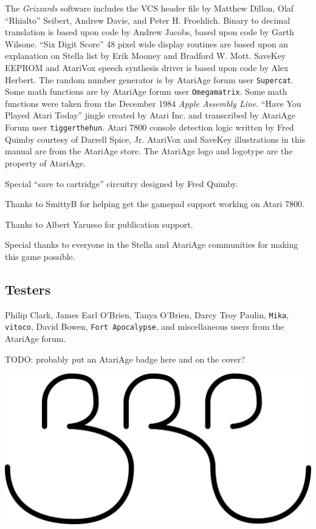 \documentclass[10pt,twocolumn,openany,article]{memoir}
\begin{document}
The \textit{Grizzards} software includes the  VCS header file by Matthew
Dillon, Olaf ``Rhialto'' Seibert, Andrew  Davie, and Peter H. Froehlich.
Binary to decimal translation is based upon code by Andrew Jacobs, based
upon code  by Garth Wilsone. ``Six  Digit Score'' 48 pixel  wide display
routines are based upon an explanation on Stella list by Erik Mooney and
Bradford W.  Mott. \ifdefined\ATARIAGESAVE\else  SaveKey EEPROM  and \fi{}
AtariVox speech  synthesis driver  is based upon  code by  Alex Herbert.
The random number generator is by AtariAge forum user \texttt{Supercat}.
Some math  functions are by AtariAge  forum user \texttt{Omega\-matrix}.
Some  math functions  were taken  from the  December 1984  \textit{Apple
  Assembly  Line}. ``Have  You Played  Atari Today''  jingle created  by
Atari    Inc.     and    transcribed    by    AtariAge     Forum    user
\texttt{tigger\-the\-hun}. Atari 7800 console detection logic written by
Fred      Quimby      courtesy      of      Darrell      Spice,      Jr.
AtariVox \ifdefined\ATARIAGESAVE\else and SaveKey \fi{}
illustrations   in   this   manual   are  from   the   AtariAge   store.
\ifdefined\ATARIAGESAVE The AtariAge logo  and logotype are the property
of AtariAge. \fi

Special ``save to cartridge'' circuitry designed by Fred Quimby.

Thanks to SmittyB for helping get the gamepad support working on Atari 7800.

Thanks to Albert Yarusso for publication support.

Special thanks  to everyone in  the Stella and AtariAge  communities for
making this game possible.

\vspace{30pt}

\subsection{Testers}

Philip Clark,
James Earl O'Brien,
Tanya O'Brien,
Darcy Troy Paulin,
\texttt{Mika},
\texttt{vitoco},
David Bowen,
\texttt{Fort Apocalypse},
and miscellaneous users from the AtariAge forum.

\vfill

\ifdefined\ATARIAGESAVE
TODO: probably put an AtariAge badge here and on the cover?
\fi

\begin{center}
  \includegraphics[width=.333\columnwidth]{../Manual/BRP.png}
\end{center}
\end{document}
